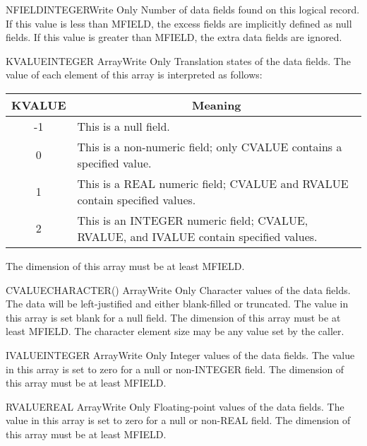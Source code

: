 \begin{argy}{NFIELD}{INTEGER}{Write Only}
Number of data fields found on this logical record.  If this value is less
than MFIELD, the excess fields are implicitly defined as null fields.  If
this value is greater than MFIELD, the extra data fields are ignored.
\end{argy}

\begin{argy}{KVALUE}{INTEGER Array}{Write Only}
Translation states of the data fields.  The value of
each element of this array is interpreted as follows:

\begin{tabular}{|cp{9 cm}|} \hline \hline
KVALUE & \multicolumn{1}{c|}{Meaning}\\ \hline
-1 & This is a null field.\\
0 & This is a non-numeric field; only CVALUE
contains a specified value.\\
1 & This is a REAL numeric field; CVALUE and
RVALUE contain specified values.\\
2 & This is an INTEGER numeric field; CVALUE,
RVALUE, and IVALUE contain specified values.\\ \hline \hline
\end{tabular}

The dimension of this array must be at least MFIELD.
\end{argy}

\begin{argy}{CVALUE}{CHARACTER\last(\last) Array}{Write Only}
Character values of the data fields.  The data will be
left-justified and either blank-filled or truncated.
The value in this array is set blank for a null field.
The dimension of this array must be at least MFIELD.
The character element size may be any value set by the
caller.
\end{argy}

\begin{argy}{IVALUE}{INTEGER Array}{Write Only}
Integer values of the data fields.  The value in this
array is set to zero for a null or non-INTEGER field.
The dimension of this array must be at least MFIELD.
\end{argy}

\begin{argy}{RVALUE}{REAL Array}{Write Only}
Floating-point values of the data fields.  The value in
this array is set to zero for a null or non-REAL field.
The dimension of this array must be at least MFIELD.
\end{argy}

